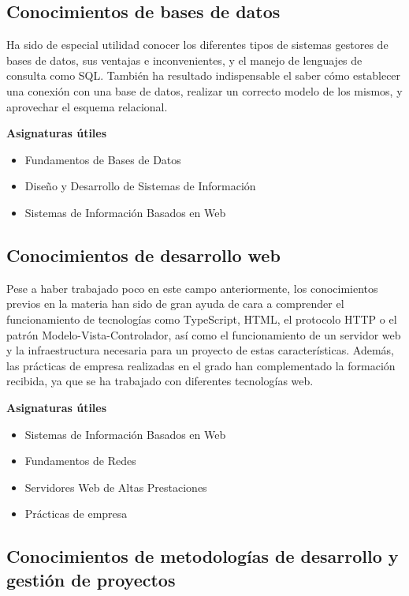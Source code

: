 \documentclass[10pt, a4paper]{aqademic}
\begin{document}
\subsection*{Conocimientos de bases de datos}

Ha sido de especial utilidad conocer los diferentes tipos de sistemas gestores de bases de datos, sus ventajas e inconvenientes, y el manejo de lenguajes de 
consulta como SQL. También ha resultado indispensable el saber cómo establecer una conexión con una base de datos, realizar un correcto modelo de los mismos, 
y aprovechar el esquema relacional.

\textbf{Asignaturas útiles} 

\begin{itemize}
	\item Fundamentos de Bases de Datos
	\item Diseño y Desarrollo de Sistemas de Información
	\item Sistemas de Información Basados en Web
\end{itemize}


\subsection*{Conocimientos de desarrollo web}

Pese a haber trabajado poco en este campo anteriormente, los conocimientos previos en la materia han sido de gran ayuda de cara a comprender el funcionamiento de tecnologías como TypeScript, HTML, el protocolo HTTP o el patrón Modelo-Vista-Controlador, así como el funcionamiento de un servidor web y la infraestructura necesaria para un proyecto de estas características. Además, las prácticas de empresa realizadas en el grado han complementado la formación recibida, ya que se ha trabajado con diferentes tecnologías web.

\textbf{Asignaturas útiles}

\begin{itemize}
	\item Sistemas de Información Basados en Web
	\item Fundamentos de Redes
	\item Servidores Web de Altas Prestaciones
	\item Prácticas de empresa
\end{itemize}


\subsection*{Conocimientos de metodologías de desarrollo y gestión de proyectos}
\end{document}

